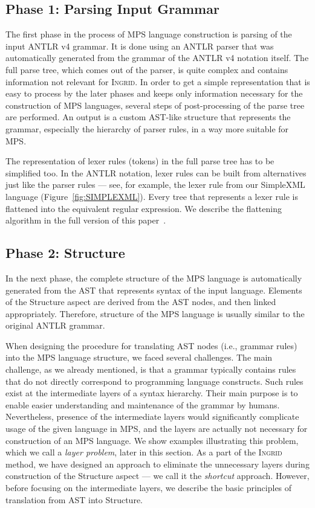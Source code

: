\subsection{Phase 1: Parsing Input Grammar}

The first phase in the process of MPS language construction is parsing of the input ANTLR v4 grammar.
It is done using an ANTLR parser that was automatically generated from the grammar of the ANTLR v4 notation itself.
The full parse tree, which comes out of the parser, is quite complex and contains information not relevant for \textsc{Ingrid}.
In order to get a simple representation that is easy to process by the later phases and keeps only information necessary for the construction of MPS languages, several steps of post-processing of the parse tree are performed.
An output is a custom AST-like structure that represents the grammar, especially the hierarchy of parser rules, in a way more suitable for MPS.

The representation of lexer rules (tokens) in the full parse tree has to be simplified too.
In the ANTLR notation, lexer rules can be built from alternatives just like the parser rules --- see, for example, the lexer rule  from our SimpleXML language (Figure~\ref{fig:SIMPLEXML}).
Every tree that represents a lexer rule is flattened into the equivalent regular expression.
We describe the flattening algorithm in the full version of this paper~\cite{ref:TRFULL}.

\subsection{Phase 2: Structure}

In the next phase, the complete structure of the MPS language is automatically generated from the AST that represents syntax of the input language.
Elements of the Structure aspect are derived from the AST nodes, and then linked appropriately.
Therefore, structure of the MPS language is usually similar to the original ANTLR grammar.

When designing the procedure for translating AST nodes (i.e., grammar rules) into the MPS language structure, we faced several challenges.
The main challenge, as we already mentioned, is that a grammar typically contains rules that do not directly correspond to programming language constructs.
Such rules exist at the intermediate layers of a syntax hierarchy.
Their main purpose is to enable easier understanding and maintenance of the grammar by humans.
Nevertheless, presence of the intermediate layers would significantly complicate usage of the given language in MPS, and the layers are actually not necessary for construction of an MPS language.
We show examples illustrating this problem, which we call a \emph{layer problem}, later in this section.
As a part of the \textsc{Ingrid} method, we have designed an approach to eliminate the unnecessary layers during construction of the Structure aspect --- we call it the \emph{shortcut} approach.
However, before focusing on the intermediate layers, we describe the basic principles of translation from AST into Structure.

